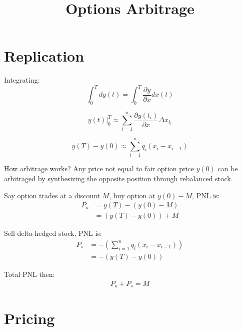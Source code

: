 \documentclass{article}
\begin{document}
\title{Options Arbitrage}
\maketitle

\section{Replication}

Integrating:
\begin{equation}
    \int_{0}^{T} d y(t) = \int_{0}^{T} \frac{\partial y}{\partial x} dx(t)
\end{equation}

\begin{equation}
    y(t) \Big|_0^T \approx \sum_{i=1}^n \frac{\partial y(t_i)}{\partial x} \Delta x_{t_i}
\end{equation}

\begin{equation}
    y(T) - y(0) \approx \sum_{i=1}^n q_i \left( x_i - x_{i-1} \right)
\end{equation}

How arbitrage works? Any price not equal to fair option price $y(0)$ can be arbitraged by synthesizing the opposite position through rebalanced stock.

Say option trades at a discount $M$, buy option at $y(0) - M$, PNL is:
\begin{equation}
  \begin{aligned}
   P_o &= y(T) - \left( y(0) - M \right) \\
       &= ( y(T) - y(0) ) + M
  \end{aligned}
\end{equation}


Sell delta-hedged stock, PNL is:
\begin{equation}
  \begin{aligned}
   P_s & = - \left( \sum_{i=1}^n q_i (x_i - x_{i-1}) \right) \\
       & = - \left( y(T) - y(0) \right)
  \end{aligned}
\end{equation}

Total PNL then:
\begin{equation}
  \begin{aligned}
   P_o + P_s = M
  \end{aligned}
\end{equation}

\section{Pricing}
\end{document}
